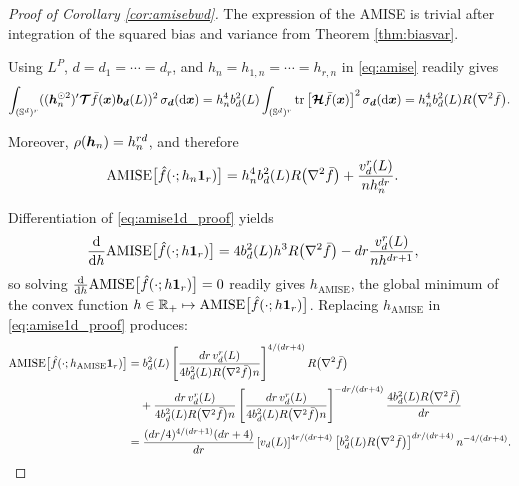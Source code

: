 \documentclass[oneside,11pt]{article}
\begin{document}
\begin{proof}[Proof of Corollary \ref{cor:amisebwd}]
The expression of the AMISE is trivial after integration of the squared bias and variance from Theorem \ref{thm:biasvar}.

Using $L^P$, $d=d_1=\cdots=d_r$, and $h_n=h_{1,n}=\cdots=h_{r,n}$ in \eqref{eq:amise} readily gives
\begin{align*}
\int_{\Sdr}((\bh_n^{\odot 2})'\bT\bar{f}(\bx)\bb_{\bd}(L))^2\,\sigmar(\rd\bx)
%
=h_n^4b_d^2(L)\int_{(\Sd)^r}\tr{\bHcal\bar{f}(\bx)}^2 \sigmar(\rd\bx)%
=h_n^4b_d^2(L)R\lrpbig{\nabla^2 \bar{f}}.
\end{align*}

Moreover, $\rho({\boldsymbol{h}}_n)=h_n^{rd}$, and therefore
\begin{align}
    \mathrm{AMISE}\big[\hat{f}(\cdot;h_n\mathbf{1}_r)\big]=&\;h_n^4b^{2}_d(L)R\big(\nabla^2 \bar{f}\big)+\frac{v^r_{d}(L)}{nh_n^{dr}}\label{eq:amise1d_proof}.
\end{align}

Differentiation of \eqref{eq:amise1d_proof} yields
\begin{align*}
\frac{\rd }{\rd h}\mathrm{AMISE}\lrcbig{\hat{f}(\cdot;h\one_r)}&=4b^{2}_d(L)h^3R\lrpbig{\nabla^2 \bar{f}}-dr\frac{v^r_d(L)}{nh^{dr+1}},%
%
\end{align*}
so solving $\frac{\mathrm{d} }{\mathrm{d} h}\mathrm{AMISE}\big[\hat{f}(\cdot;h\mathbf{1}_r)\big]=0$ readily gives $h_\mathrm{AMISE}$, the global minimum of the convex function $h\in\mathbb{R}_+\mapsto \mathrm{AMISE}\big[\hat{f}(\cdot;h\mathbf{1}_r)\big]$. Replacing $h_\mathrm{AMISE}$ in \eqref{eq:amise1d_proof} produces:
\begin{align*}
    \mathrm{AMISE}\big[\hat{f}(\cdot;h_\mathrm{AMISE}\mathbf{1}_r)\big]=&\;b^{2}_d(L)\left[\frac{dr\,v^r_d(L)}{4b^{2}_d(L)R\big(\nabla^2 \bar{f}\big)n}\right]^{4/(dr+4)}R\big(\nabla^2 \bar{f}\big)\\
    &+\frac{dr\,v^r_d(L)}{4b^{2}_d(L)R\big(\nabla^2 \bar{f}\big)n}\left[\frac{dr\,v^r_d(L)}{4b^{2}_d(L)R\big(\nabla^2 \bar{f}\big)n}\right]^{-dr/(dr+4)}\frac{4b^{2}_d(L)R\big(\nabla^2 \bar{f}\big)}{dr}\\
    =&\;\frac{(dr/4)^{4/(dr+1)}(dr+4)}{dr} \left[v_d(L)\right]^{4r/(dr+4)} \left[b^{2}_d(L)R\big(\nabla^2 \bar{f}\big)\right]^{dr/(dr+4)} n^{-4/(dr+4)}.
\end{align*}
\end{proof}
\end{document}

